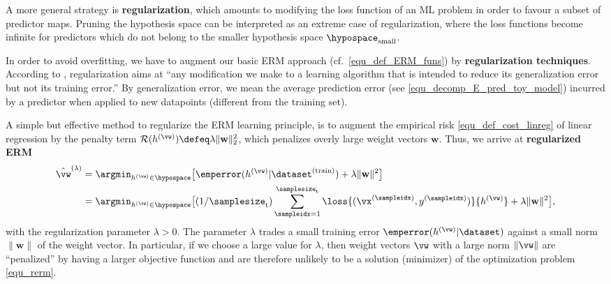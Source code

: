 \documentclass[12pt]{report}
\begin{document}
A more general strategy is {\bf regularization}, which amounts to modifying the loss 
function of an ML problem in order to favour a subset of predictor maps. Pruning the 
hypothesis space can be interpreted as an extreme case of regularization, where the 
loss functions become infinite for predictors which do not belong to the smaller 
hypothesis space $\hypospace_{\rm small}$. 

%

In order to avoid overfitting, we have to augment our basic ERM approach 
(cf.\ \eqref{equ_def_ERM_funs}) by {\bf regularization techniques}. According 
to \cite{Goodfellow-et-al-2016}, regularization aims at ``any modification we 
make to a learning algorithm that is intended to reduce its generalization error 
but not its training error.'' By generalization error, we mean the average prediction 
error (see \eqref{equ_decomp_E_pred_toy_model}) incurred by a predictor 
when applied to new datapoints (different from the training set). 

A simple but effective method to regularize the ERM learning principle, is to 
augment the empirical risk \eqref{equ_def_cost_linreg} of linear regression 
by the penalty term $\mathcal{R}(h^{(\vw)}) \defeq \lambda \| \mathbf{w} \|^{2}_{2}$, 
which penalizes overly large weight vectors $\mathbf{w}$. Thus, we arrive 
at {\bf regularized ERM}
\begin{align} 
\label{equ_rerm}
\hat{\vw}^{(\lambda)}  & = \argmin_{h^{(\vw)} \in  \hypospace} \big[ \emperror(h^{(\vw)}|\dataset^{(\rm train)})+ \lambda \| \mathbf{w} \|^{2} \big] \nonumber \\ %
&  = \argmin_{h^{(\vw)} \in  \hypospace} \big[(1/\samplesize_{\rm t}) \sum_{\sampleidx=1}^{\samplesize_{\rm t}} \loss{(\vx^{(\sampleidx)},y^{(\sampleidx)})}{h^{(\vw)}} + \lambda \| \mathbf{w} \|^{2} \big],
\end{align}
with the regularization parameter $\lambda >0$. The parameter $\lambda$ trades 
a small training error $\emperror(h^{(\vw)}|\dataset)$ against a small norm $\| \mathbf{w} \|$ 
of the weight vector. In particular, if we choose a large value for $\lambda$, then 
weight vectors $\vw$ with a large norm $\| \vw \|$ are ``penalized'' by having a larger 
objective function and are therefore unlikely to be a solution (minimizer) of the 
optimization problem \eqref{equ_rerm}. 
\end{document}
